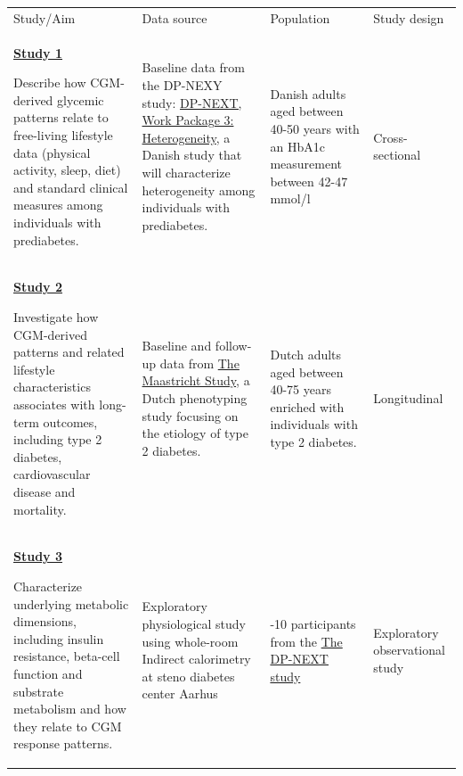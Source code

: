 \documentclass[
  12pt,
  letterpaper,
  DIV=11,
  numbers=noendperiod]{scrartcl}
\newcounter{none} %
\begin{document}
{\def\LTcaptype{none} %
\begin{longtable}[]{@{}
  >{\raggedright\arraybackslash}p{}
  >{\raggedright\arraybackslash}p{}
  >{\raggedright\arraybackslash}p{}
  >{\raggedright\arraybackslash}p{}@{}}
\toprule\noalign{}
\endhead
\bottomrule\noalign{}
\endlastfoot
Study/Aim & Data source & Population & Study design \\
\ul{\textbf{Study 1}}

Describe how CGM-derived glycemic patterns relate to free-living
lifestyle data (physical activity, sleep, diet) and standard clinical
measures among individuals with prediabetes. &
\begin{minipage}[t]{\linewidth}\raggedright
Baseline data from the DP-NEXY study:
\href{https://dp-next.github.io/wp3.html}{DP-NEXT, Work Package 3:
Heterogeneity}, a Danish study that will characterize heterogeneity
among individuals with prediabetes.

\hfill\break
\strut
\end{minipage} & Danish adults aged between 40-50 years with an HbA1c
measurement between 42-47 mmol/l & Cross-sectional \\
\ul{\textbf{Study 2}}

Investigate how CGM-derived patterns and related lifestyle
characteristics associates with long-term outcomes, including type 2
diabetes, cardiovascular disease and mortality. & Baseline and follow-up
data from \href{https://www.demaastrichtstudie.nl/research}{The
Maastricht Study}, a Dutch phenotyping study focusing on the etiology of
type 2 diabetes. & Dutch adults aged between 40-75 years enriched with
individuals with type 2 diabetes. & Longitudinal \\
\ul{\textbf{Study 3}}

Characterize underlying metabolic dimensions, including insulin
resistance, beta-cell function and substrate metabolism and how they
relate to CGM response patterns. & Exploratory physiological study using
whole-room Indirect calorimetry at steno diabetes center Aarhus & 5-10
participants from the \href{https://dp-next.github.io}{The DP-NEXT
study} & Exploratory observational study \\
\end{longtable}
}
\end{document}
